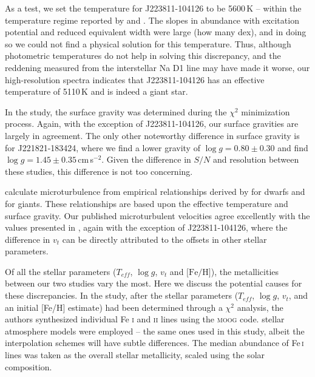 \documentclass{emulateapj}
\begin{document}
As a test, we set the temperature for J223811-104126 to be 5600\,K -- within the temperature regime reported by \citet{williams;et-al_2011} and \citet{wylie-de-boer;et-al_2012}. The slopes in abundance with excitation potential and reduced equivalent width were large (how many dex), and in doing so we could not find a physical solution for this temperature. Thus, although photometric temperatures do not help in solving this discrepancy, and the reddening measured from the interstellar Na D1 line may have made it worse, our high-resolution spectra  indicates that J223811-104126 has an effective temperature of 5110\,K and is indeed a giant star.

In the \citet{wylie-de-boer;et-al_2012} study, the surface gravity was determined during the $\chi^2$ minimization process. Again, with the exception of J223811-104126, our surface gravities are largely in agreement. The only other noteworthy difference in surface gravity is for J221821-183424, where we find a lower gravity of $\log{g} = 0.80 \pm 0.30$ and \citet{wylie-de-boer;et-al_2012} find $\log{g} = 1.45 \pm 0.35$\,cm\,s$^{-2}$. Given the difference in $S/N$ and resolution between these studies, this difference is not too concerning. 

\citet{wylie-de-boer;et-al_2012} calculate microturbulence from empirical relationships derived by \citet{Reddy;et-al_2003} for dwarfs and \citet{fulbright_2000} for giants. These relationships are based upon the effective temperature and surface gravity. Our published microturbulent velocities agree excellently with the values presented in \citet{wylie-de-boer;et-al_2012}, again with the exception of J223811-104126, where the difference in $v_{t}$ can be  directly attributed to the offsets in other stellar parameters.

Of all the stellar parameters ($T_{eff}$, $\log{g}$, $v_{t}$ and $\mbox{[Fe/H]}$), the metallicities between our two studies vary the most. Here we discuss the potential causes for these discrepancies. In the \citet{wylie-de-boer;et-al_2012} study, after the stellar parameters ($T_{eff}$, $\log{g}$, $v_{t}$, and an initial [Fe/H] estimate) had been determined through a $\chi^2$ analysis, the authors synthesized individual Fe \textsc{i} and \textsc{ii} lines using the \textsc{moog} code. \citet{castelli;kurucz_2003} stellar atmosphere models were employed \--- the same ones used in this study, albeit the interpolation schemes will have subtle differences. The median abundance of Fe\,\textsc{i} lines was taken as the overall stellar metallicity, scaled using the \citet{grevesse;sauval_1998} solar composition.
\end{document}
